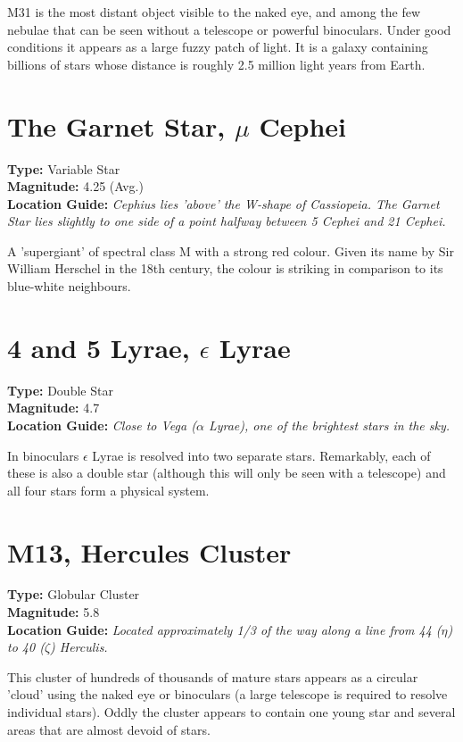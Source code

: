 M31 is the most distant object visible to the naked eye, and among the
few nebulae that can be seen without a telescope or powerful
binoculars. Under good conditions it appears as a large fuzzy patch of
light. It is a galaxy containing billions of stars whose distance is
roughly 2.5 million light years from Earth.

\section{The Garnet Star, $\mu$ Cephei}
\textbf{Type:} Variable Star \\
\textbf{Magnitude:} 4.25 (Avg.) \\
\textbf{Location Guide:} \textit{Cephius lies 'above' the W-shape of Cassiopeia. The Garnet Star lies slightly to one side of a point halfway between 5 Cephei and 21 Cephei.}

A 'supergiant' of spectral class M with a strong red colour. Given its
name by Sir William Herschel in the 18th century, the colour is
striking in comparison to its blue-white neighbours.

\section{4 and 5 Lyrae, $\epsilon$ Lyrae}
\textbf{Type:} Double Star \\
\textbf{Magnitude:} 4.7 \\
\textbf{Location Guide:} \textit{Close to Vega ($\alpha$ Lyrae), one of the brightest stars in the sky.}

In binoculars $\epsilon$ Lyrae is resolved into two separate
stars. Remarkably, each of these is also a double star (although this
will only be seen with a telescope) and all four stars form a physical
system.

\section{M13, Hercules Cluster} 
\textbf{Type:} Globular Cluster \\ 
\textbf{Magnitude:} 5.8 \\
\textbf{Location Guide:} \textit{Located approximately 1/3 of the way along a line from 44 ($\eta$) to 40 ($\zeta$) Herculis.}

This cluster of hundreds of thousands of mature stars appears as
a circular 'cloud' using the naked eye or binoculars (a large
telescope is required to resolve individual stars). Oddly the cluster
appears to contain one young star and several areas that are almost
devoid of stars.

